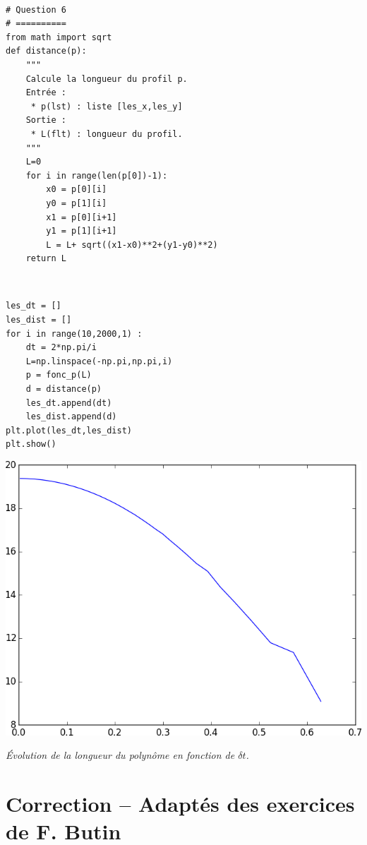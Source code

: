 \documentclass[10pt,fleqn]{article} %
\begin{document}
\begin{corrige}
$\quad$
\begin{lstlisting}
# Question 6
# ==========
from math import sqrt
def distance(p):
    """
    Calcule la longueur du profil p.
    Entrée : 
     * p(lst) : liste [les_x,les_y]
    Sortie : 
     * L(flt) : longueur du profil.
    """
    L=0
    for i in range(len(p[0])-1):
        x0 = p[0][i]
        y0 = p[1][i]
        x1 = p[0][i+1]
        y1 = p[1][i+1]
        L = L+ sqrt((x1-x0)**2+(y1-y0)**2)
    return L
\end{lstlisting}
\end{corrige}

\begin{corrige}
$\quad$
\begin{lstlisting}
les_dt = []
les_dist = []
for i in range(10,2000,1) :
    dt = 2*np.pi/i
    L=np.linspace(-np.pi,np.pi,i)
    p = fonc_p(L)
    d = distance(p)
    les_dt.append(dt)
    les_dist.append(d)
plt.plot(les_dt,les_dist)
plt.show()       
\end{lstlisting}
\end{corrige}


\begin{center}
\includegraphics[width=.4\linewidth]{programmes/Exercice_12/figure_2}

\textit{Évolution de la longueur du polynôme en fonction de $\delta t$.}
\end{center}



\newpage 

\section{Correction -- Adaptés des exercices de F. Butin}
\end{document}
